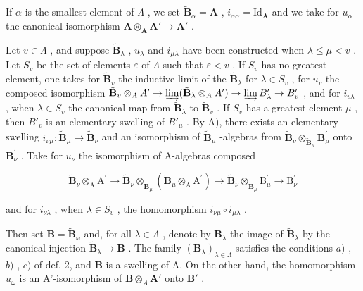 If \(\alpha\) is the smallest element of \(\Lambda\) , we set \(\tilde{\mathbf{B}}_{\alpha} = \mathbf{A}\) , \(i_{\alpha \alpha} = \mathrm{Id}_{\mathbf{A}}\) and we take for \(u_{\alpha}\) the canonical isomorphism \(\mathbf{A} \otimes_{\mathbf{A}} \mathbf{A}' \to \mathbf{A}'\) .

Let \(v \in \Lambda\) , and suppose \(\tilde{\mathbf{B}}_{\lambda}\) , \(u_{\lambda}\) and \(i_{\mu \lambda}\) have been constructed when \(\lambda \leqslant \mu < v\) . Let \(S_v\) be the set of elements \(\varepsilon\) of \(\Lambda\) such that \(\varepsilon < v\) . If \(S_v\) has no greatest element, one takes for \(\tilde{\mathbf{B}}_v\) the inductive limit of the \(\tilde{\mathbf{B}}_{\lambda}\) for \(\lambda \in S_v\) , for \(u_v\) the composed isomorphism \(\tilde{\mathbf{B}}_v \otimes_A A' \to \varinjlim (\tilde{\mathbf{B}}_{\lambda} \otimes_A A') \to \varinjlim B'_\lambda \to B'_v\) , and for \(i_{v\lambda}\) , when \(\lambda \in S_v\) the canonical map from \(\tilde{\mathbf{B}}_{\lambda}\) to \(\tilde{\mathbf{B}}_v\) . If \(S_v\) has a greatest element \(\mu\) , then \(B'_v\) is an elementary swelling of \(B'_\mu\) . By A), there exists an elementary swelling \(i_{\nu \mu}:\tilde{\mathbf{B}}_{\mu}\to \tilde{\mathbf{B}}_{\nu}\) and an isomorphism of \(\tilde{\mathbf{B}}_{\mu}\) -algebras from \(\tilde{\mathbf{B}}_{\nu}\otimes_{\tilde{\mathbf{B}}_{\mu}}\mathbf{B}_{\mu}^{\prime}\) onto \(\mathbf{B}_{\nu}^{\prime}\) . Take for \(u_{\nu}\) the isomorphism of A-algebras composed

\[
\widetilde {\mathbf {B}} _ {\nu} \otimes_ {\mathrm{A}} \mathrm{A} ^ {\prime} \rightarrow \widetilde {\mathbf {B}} _ {\nu} \otimes_ {\widetilde {\mathbf {B}} _ {\mu}} (\widetilde {\mathbf {B}} _ {\mu} \otimes_ {\mathrm{A}} \mathrm{A} ^ {\prime}) \rightarrow \widetilde {\mathbf {B}} _ {\nu} \otimes_ {\widetilde {\mathbf {B}} _ {\mu}} \mathrm{B} _ {\mu} ^ {\prime} \rightarrow \mathrm{B} _ {\nu} ^ {\prime}
\]

and for \(i_{\nu \lambda}\) , when \(\lambda \in S_{v}\) , the homomorphism \(i_{\nu \mu} \circ i_{\mu \lambda}\) .

Then set \(\mathbf{B} = \tilde{\mathbf{B}}_{\omega}\) and, for all \(\lambda \in \Lambda\) , denote by \(\mathbf{B}_{\lambda}\) the image of \(\tilde{\mathbf{B}}_{\lambda}\) by the canonical injection \(\tilde{\mathbf{B}}_{\lambda} \to \mathbf{B}\) . The family \((\mathbf{B}_{\lambda})_{\lambda \in \Lambda}\) satisfies the conditions \(a)\) , \(b)\) , \(c)\) of def. 2, and \(\mathbf{B}\) is a swelling of A. On the other hand, the homomorphism \(u_{\omega}\) is an A'-isomorphism of \(\mathbf{B} \otimes_{A} \mathbf{A}'\) onto \(\mathbf{B}'\) .

